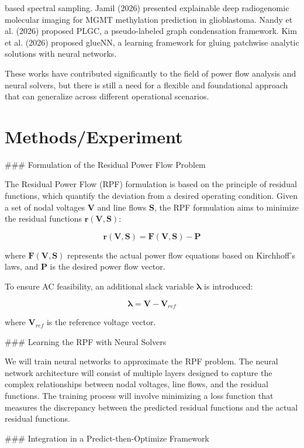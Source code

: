 based spectral sampling. Jamil (2026) presented explainable deep radiogenomic molecular imaging for MGMT methylation prediction in glioblastoma. Nandy et al. (2026) proposed PLGC, a pseudo-labeled graph condensation framework. Kim et al. (2026) proposed glueNN, a learning framework for gluing patchwise analytic solutions with neural networks.

These works have contributed significantly to the field of power flow analysis and neural solvers, but there is still a need for a flexible and foundational approach that can generalize across different operational scenarios.

\section{Methods/Experiment}

### Formulation of the Residual Power Flow Problem

The Residual Power Flow (RPF) formulation is based on the principle of residual functions, which quantify the deviation from a desired operating condition. Given a set of nodal voltages \( \mathbf{V} \) and line flows \( \mathbf{S} \), the RPF formulation aims to minimize the residual functions \( \mathbf{r}(\mathbf{V}, \mathbf{S}) \):

\[ \mathbf{r}(\mathbf{V}, \mathbf{S}) = \mathbf{F}(\mathbf{V}, \mathbf{S}) - \mathbf{P} \]

where \( \mathbf{F}(\mathbf{V}, \mathbf{S}) \) represents the actual power flow equations based on Kirchhoff's laws, and \( \mathbf{P} \) is the desired power flow vector.

To ensure AC feasibility, an additional slack variable \( \mathbf{\lambda} \) is introduced:

\[ \mathbf{\lambda} = \mathbf{V} - \mathbf{V}_{ref} \]

where \( \mathbf{V}_{ref} \) is the reference voltage vector.

### Learning the RPF with Neural Solvers

We will train neural networks to approximate the RPF problem. The neural network architecture will consist of multiple layers designed to capture the complex relationships between nodal voltages, line flows, and the residual functions. The training process will involve minimizing a loss function that measures the discrepancy between the predicted residual functions and the actual residual functions.

### Integration in a Predict-then-Optimize Framework

